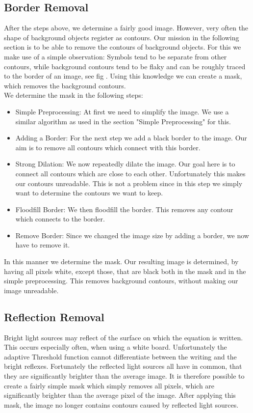 \documentclass[12pt]{article}
\begin{document}
	
	\subsection{Border Removal}%
		After the steps above, we determine a fairly good image.
		However, very often the shape of background objects register as contours.
		Our mission in the following section is to be able to remove the contours of background objects.
		For this we make use of a simple observation: Symbols tend to be separate from other contours, while background contours tend to be flaky and can be roughly traced to the border of an image, see fig .%
		Using this knowledge we can create a mask, which removes the background contours.\\
		We determine the mask in the following steps:
		\begin{itemize}
			\item Simple Preprocessing: At first we need to simplify the image. We use a similar algorithm as used in the section "Simple Preprocessing" for this.
			\item Adding a Border: For the next step we add a black border to the image. Our aim is to remove all contours which connect with this border.
			\item Strong Dilation: We now repeatedly dilate the image. Our goal here is to connect all contours which are close to each other.
			Unfortunately this makes our contours unreadable.
			This is not a problem since in this step we simply want to determine the contours we want to keep.
			\item Floodfill Border: We then floodfill the border.
			This removes any contour which connects to the border. 
			\item Remove Border: Since we changed the image size by adding a border, we now have to remove it.
		\end{itemize}
		In this manner we determine the mask.
		Our resulting image is determined, by having all pixels white, except those, that are black both in the mask and in the simple preprocessing.
		This removes background contours, without making our image unreadable.


	\subsection{Reflection Removal}
		Bright light sources may reflect of the surface on which the equation is written.
		This occurs especially often, when using a white board.
		Unfortunately the adaptive Threshold function cannot differentiate between the writing and the bright reflexes.
		Fortunately the reflected light sources all have in common, that they are significantly brighter than the average image.
		It is therefore possible to create a fairly simple mask which simply removes all pixels, which are significantly brighter than the average pixel of the image.
		After applying this mask, the image no longer contains contours caused by reflected light sources.%
		
\end{document}
